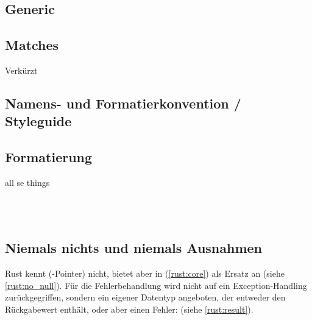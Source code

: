 \subsection{Generic}




\subsection{Matches}


Verkürzt




\subsection{Namens- und Formatierkonvention / Styleguide}

\cite{rust:styleguide}

\subsection{Formatierung}
 all se things






 \\

 \\
\cite{rust:orly_programming}


\subsection{Niemals nichts und niemals Ausnahmen }

Rust kennt (-Pointer) nicht, bietet aber in  (\autoref{rust:core})  als Ersatz an (siehe \autoref{rust:no_null}).
Für die Fehlerbehandlung wird nicht auf ein Exception-Handling zurückgegriffen, sondern ein eigener Datentyp angeboten, der entweder den Rückgabewert enthält, oder aber einen Fehler:  (siehe \autoref{rust:result}).


